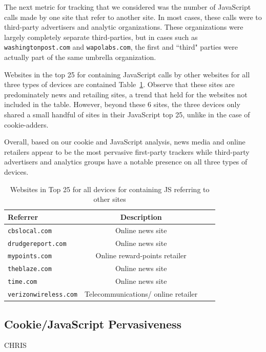 \documentclass{acm_proc_article-sp}
\begin{document}
The next metric for tracking that we considered was the number of JavaScript calls made by one site that refer to another site. In most cases, these calls were to third-party advertisers and analytic organizations. These organizations were largely completely separate third-parties, but in cases such as \texttt{washingtonpost.com} and \texttt{wapolabs.com}, the first and  ``third" parties were actually part of the same umbrella organization. 

Websites in the top 25 for containing JavaScript calls by other websites for all three types of devices are contained Table~\ref{tab:major_js}. Observe that these sites are predominately news and retailing sites, a trend that held for the websites not included in the table. However, beyond these 6 sites, the three devices only shared a small handful of sites in their JavaScript top 25, unlike in the case of cookie-adders.

Overall, based on our cookie and JavaScript analysis, news media and online retailers appear to be the most pervasive first-party trackers while third-party advertisers and analytics groups have a notable presence on all three types of devices.

\begin{table}[htbp]
  \centering
  \caption{Websites in Top 25 for all devices for containing JS referring to other sites}
    \begin{tabular}{|c|c|c|c|}
    \hline
     \multicolumn{1}{|l|}{\textbf{Referrer}} & \textbf{Description}    \\ \hline
     \multicolumn{1}{|l|}{\texttt{cbslocal.com}} & Online news site   \\
    \multicolumn{1}{|l|}{\texttt{drudgereport.com}} & Online news site   \\
     \multicolumn{1}{|l|}{\texttt{mypoints.com}} & Online reward-points retailer   \\
      \multicolumn{1}{|l|}{\texttt{theblaze.com}} & Online news site   \\
       \multicolumn{1}{|l|}{\texttt{time.com}} & Online news site   \\
        \multicolumn{1}{|l|}{\texttt{verizonwireless.com}} & Telecommunications/ online retailer   \\ \hline
    \end{tabular}%
  \label{tab:major_js}%
\end{table}%


\subsection{Cookie/JavaScript Pervasiveness}
CHRIS
\end{document}

